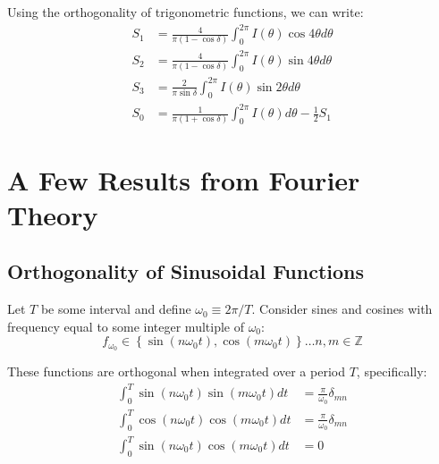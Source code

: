 \documentclass{article}
\begin{document}
Using the orthogonality of trigonometric functions, we can write:
\begin{subequations}
    \begin{align}
        \label{eq:extract_coeffs}
        S_1 &= \frac{4}{\pi(1-\cos\delta)}\int_0^{2\pi}I(\theta)\cos4\theta d\theta \\
        S_2 &= \frac{4}{\pi(1-\cos\delta)}\int_0^{2\pi}I(\theta)\sin4\theta d\theta \\
        S_3 &= \frac{2}{\pi\sin\delta}\int_0^{2\pi}I(\theta)\sin2\theta d\theta \\
        S_0 &= \frac{1}{\pi(1+\cos\delta)}\int_0^{2\pi}I(\theta) d\theta - \frac{1}{2}S_1
    \end{align}
\end{subequations}

\section{A Few Results from Fourier Theory}
\label{sec:fourier}
\subsection{Orthogonality of Sinusoidal Functions}
Let $T$ be some interval and define $\omega_0 \equiv 2\pi/T$. Consider sines and cosines with frequency equal to some integer multiple of $\omega_0$:
\begin{equation}
    \label{eq:class_ortho}
    f_{\omega_0} \in \left\{\sin\left(n\omega_0t\right),\cos\left(m\omega_0t\right)\right\} \ldots n,m\in\mathbb{Z}
\end{equation}

\noindent These functions are orthogonal when integrated over a period $T$, specifically:
\begin{subequations}
    \begin{align}
        \label{eq:extract_coeffs}
        \int_0^T\sin\left(n\omega_0t\right)\sin\left(m\omega_0t\right)dt &= \frac{\pi}{\omega_0}\delta_{mn} \\
        \int_0^T\cos\left(n\omega_0t\right)\cos\left(m\omega_0t\right)dt &= \frac{\pi}{\omega_0}\delta_{mn} \\
        \int_0^T\sin\left(n\omega_0t\right)\cos\left(m\omega_0t\right)dt &= 0
    \end{align}
\end{subequations}
\end{document}
